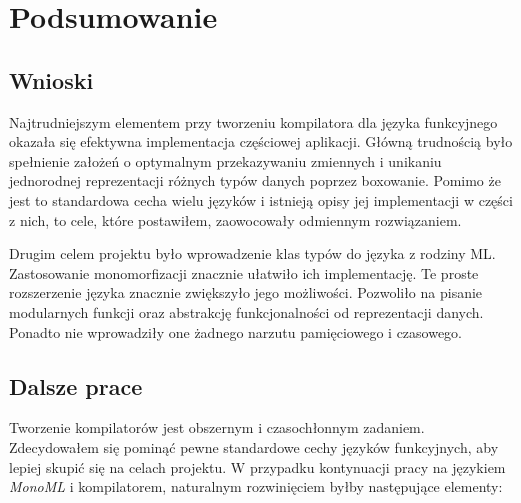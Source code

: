 \documentclass[declaration,shortabstract]{iithesis}
\begin{document}


\chapter{Podsumowanie}

\section{Wnioski}
Najtrudniejszym elementem przy tworzeniu kompilatora dla języka funkcyjnego 
okazała się efektywna implementacja częściowej aplikacji. Główną trudnością
było spełnienie założeń o optymalnym przekazywaniu zmiennych i unikaniu 
jednorodnej reprezentacji różnych typów danych poprzez boxowanie. Pomimo że 
jest to standardowa cecha wielu języków i istnieją opisy jej implementacji
w części z nich, to cele, które postawiłem, zaowocowały odmiennym rozwiązaniem.

Drugim celem projektu było wprowadzenie klas typów do języka z rodziny ML. 
Zastosowanie monomorfizacji znacznie ułatwiło ich implementację. Te proste
rozszerzenie języka znacznie zwiększyło jego możliwości. Pozwoliło na 
pisanie modularnych funkcji oraz abstrakcję funkcjonalności od reprezentacji 
danych. Ponadto nie wprowadziły one żadnego narzutu pamięciowego i czasowego.

\section{Dalsze prace}

Tworzenie kompilatorów jest obszernym i czasochłonnym zadaniem. Zdecydowałem 
się pominąć pewne standardowe cechy języków funkcyjnych, aby lepiej skupić 
się na celach projektu. W przypadku kontynuacji pracy na językiem \textit{MonoML}
i kompilatorem, naturalnym rozwinięciem byłby następujące elementy:
\end{document}
